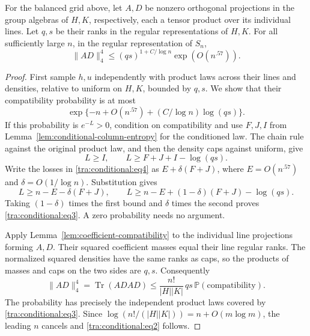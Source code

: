 \begin{proposition}\label{tra:conditional:crossing}
\label{tra:conditional:crossing-statement}\label{e:conditional-rank-crossing}
For the balanced grid above, let $A,D$ be nonzero orthogonal
projections in the group algebras of $H,K$, respectively, each a tensor
product over its individual lines. Let $q,s$ be their ranks in the
regular representations of $H,K$. For all sufficiently large $n$,
in the regular representation of $S_n$,
\begin{equation}
 \|AD\|_4^4\le(qs)^{1+C/\log n}\exp(O(n^{.57})).
 \label{tra:conditional:eq2}
\end{equation}
\end{proposition}
\begin{proof}\label{tra:conditional:crossing-proof}
First sample $h,u$ independently with product laws across their lines
and densities, relative to uniform on $H,K$, bounded by $q,s$.
We show that their compatibility probability is at most
\begin{equation}
 \exp\{-n+O(n^{.57})+(C/\log n)\log(qs)\}.
 \label{tra:conditional:eq3}
\end{equation}
If this probability is $e^{-L}>0$, condition on compatibility and
use $F,J,I$ from Lemma~\ref{lem:conditional-column-entropy} for the
conditioned law. The chain rule against the original product law,
and then the density caps against uniform, give
\[
 L\ge I,\qquad L\ge F+J+I-\log(qs).
\]
Write the losses in \eqref{tra:conditional:eq4} as
$E+\delta(F+J)$, where $E=O(n^{.57})$ and
$\delta=O(1/\log n)$. Substitution gives
\[
 L\ge n-E-\delta(F+J),\qquad
 L\ge n-E+(1-\delta)(F+J)-\log(qs).
\]
Taking $(1-\delta)$ times the first bound and $\delta$ times the
second proves \eqref{tra:conditional:eq3}. A zero probability needs
no argument.

Apply Lemma~\ref{lem:coefficient-compatibility} to the individual line
projections forming $A,D$. Their squared coefficient masses equal
their line regular ranks. The normalized squared densities have the
same ranks as caps, so the products of masses and caps on the two
sides are $q,s$. Consequently
\[
 \|AD\|_4^4=\operatorname{Tr}(ADAD)
 \le\frac{n!}{|H||K|}\,qs\,
       \mathbb P(\text{compatibility}).
\]
The probability has precisely the independent product laws covered by
\eqref{tra:conditional:eq3}. Since
$\log(n!/(|H||K|))=n+O(m\log m)$, the leading $n$ cancels and
\eqref{tra:conditional:eq2} follows.
\end{proof}
